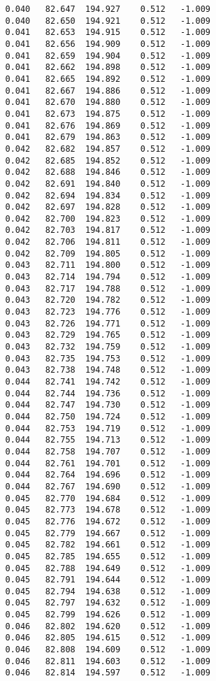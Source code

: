 \begin{verbatim}
   0.040   82.647  194.927    0.512   -1.009
   0.040   82.650  194.921    0.512   -1.009
   0.041   82.653  194.915    0.512   -1.009
   0.041   82.656  194.909    0.512   -1.009
   0.041   82.659  194.904    0.512   -1.009
   0.041   82.662  194.898    0.512   -1.009
   0.041   82.665  194.892    0.512   -1.009
   0.041   82.667  194.886    0.512   -1.009
   0.041   82.670  194.880    0.512   -1.009
   0.041   82.673  194.875    0.512   -1.009
   0.041   82.676  194.869    0.512   -1.009
   0.041   82.679  194.863    0.512   -1.009
   0.042   82.682  194.857    0.512   -1.009
   0.042   82.685  194.852    0.512   -1.009
   0.042   82.688  194.846    0.512   -1.009
   0.042   82.691  194.840    0.512   -1.009
   0.042   82.694  194.834    0.512   -1.009
   0.042   82.697  194.828    0.512   -1.009
   0.042   82.700  194.823    0.512   -1.009
   0.042   82.703  194.817    0.512   -1.009
   0.042   82.706  194.811    0.512   -1.009
   0.042   82.709  194.805    0.512   -1.009
   0.043   82.711  194.800    0.512   -1.009
   0.043   82.714  194.794    0.512   -1.009
   0.043   82.717  194.788    0.512   -1.009
   0.043   82.720  194.782    0.512   -1.009
   0.043   82.723  194.776    0.512   -1.009
   0.043   82.726  194.771    0.512   -1.009
   0.043   82.729  194.765    0.512   -1.009
   0.043   82.732  194.759    0.512   -1.009
   0.043   82.735  194.753    0.512   -1.009
   0.043   82.738  194.748    0.512   -1.009
   0.044   82.741  194.742    0.512   -1.009
   0.044   82.744  194.736    0.512   -1.009
   0.044   82.747  194.730    0.512   -1.009
   0.044   82.750  194.724    0.512   -1.009
   0.044   82.753  194.719    0.512   -1.009
   0.044   82.755  194.713    0.512   -1.009
   0.044   82.758  194.707    0.512   -1.009
   0.044   82.761  194.701    0.512   -1.009
   0.044   82.764  194.696    0.512   -1.009
   0.044   82.767  194.690    0.512   -1.009
   0.045   82.770  194.684    0.512   -1.009
   0.045   82.773  194.678    0.512   -1.009
   0.045   82.776  194.672    0.512   -1.009
   0.045   82.779  194.667    0.512   -1.009
   0.045   82.782  194.661    0.512   -1.009
   0.045   82.785  194.655    0.512   -1.009
   0.045   82.788  194.649    0.512   -1.009
   0.045   82.791  194.644    0.512   -1.009
   0.045   82.794  194.638    0.512   -1.009
   0.045   82.797  194.632    0.512   -1.009
   0.045   82.799  194.626    0.512   -1.009
   0.046   82.802  194.620    0.512   -1.009
   0.046   82.805  194.615    0.512   -1.009
   0.046   82.808  194.609    0.512   -1.009
   0.046   82.811  194.603    0.512   -1.009
   0.046   82.814  194.597    0.512   -1.009

\end{verbatim}
